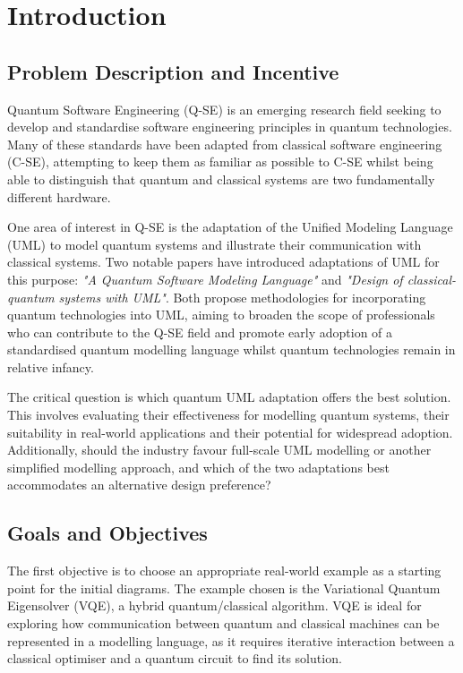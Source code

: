 \documentclass{article}
\begin{document}
\tableofcontents

\newpage

\section{Introduction}

\subsection{Problem Description and Incentive}

Quantum Software Engineering (Q-SE) is an emerging research field seeking to develop and standardise software engineering principles in quantum technologies. Many of these standards have been adapted from classical software engineering (C-SE), attempting to keep them as familiar as possible to C-SE whilst being able to distinguish that quantum and classical systems are two fundamentally different hardware. 

One area of interest in Q-SE is the adaptation of the Unified Modeling Language (UML) to model quantum systems and illustrate their communication with classical systems. Two notable papers have introduced adaptations of UML for this purpose: \textit{"A Quantum Software Modeling Language"} and \textit{"Design of classical-quantum systems with UML"}\cite{Pérez-Delgado2022}\cite{Pérez-Castillo2022}. Both propose methodologies for incorporating quantum technologies into UML, aiming to broaden the scope of professionals who can contribute to the Q-SE field and promote early adoption of a standardised quantum modelling language whilst quantum technologies remain in relative infancy. 

The critical question is which quantum UML adaptation offers the best solution. This involves evaluating their effectiveness for modelling quantum systems, their suitability in real-world applications and their potential for widespread adoption. Additionally, should the industry favour full-scale UML modelling or another simplified modelling approach, and which of the two adaptations best accommodates an alternative design preference?

\subsection{Goals and Objectives}

The first objective is to choose an appropriate real-world example as a starting point for the initial diagrams. The example chosen is the Variational Quantum Eigensolver (VQE), a hybrid quantum/classical algorithm. VQE is ideal for exploring how communication between quantum and classical machines can be represented in a modelling language, as it requires iterative interaction between a classical optimiser and a quantum circuit to find its solution. 
\end{document}
